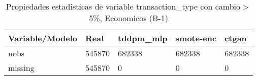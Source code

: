 \begin{table}[H]
\centering
\fontsize{8}{14}\selectfont
\caption{Propiedades estadisticas de variable transaction\_type con cambio\ensuremath{>}5\%, Economicos (B-1)}
\label{table-stats-economicos-b-1-transaction_type-short}
\begin{tabular}{|l|m{10em}|m{10em}|m{10em}|m{10em}|}
\hline
 \rowcolor[gray]{0.8}
Variable/Modelo & Real & tddpm\_mlp & smote-enc & ctgan \\
\hline nobs & 545870 & 682338 & 682338 & 682338 \\
\hline missing & 545870 & 0 & 0 & 0 \\
\hline
\end{tabular}
\end{table}
